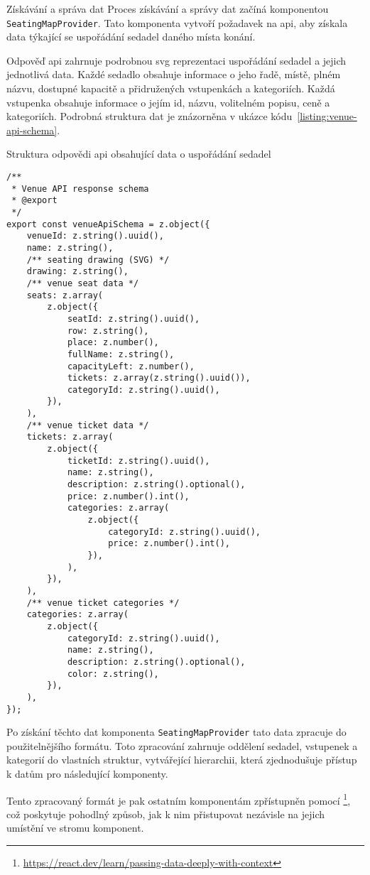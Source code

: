 \begin{subsection}{Získávání a správa dat}
    \label{subsec:implementace-seating-data}
    Proces získávání a správy dat začíná komponentou \texttt{SeatingMapProvider}.
    Tato komponenta vytvoří požadavek na \ac{api}, aby získala data týkající se uspořádání sedadel daného místa konání.

    Odpověď \ac{api} zahrnuje podrobnou \ac{svg} reprezentaci uspořádání sedadel a jejich jednotlivá data.
    Každé sedadlo obsahuje informace o jeho řadě, místě, plném názvu, dostupné kapacitě a přidružených vstupenkách a kategoriích.
    Každá vstupenka obsahuje informace o jejím id, názvu, volitelném popisu, ceně a kategoriích.
    Podrobná struktura dat je znázorněna v ukázce kódu~\ref{listing:venue-api-schema}.

    \begin{listing}[H]
        \caption{Struktura odpovědi \ac{api} obsahující data o uspořádání sedadel}
        \begin{verbatim}
/**
 * Venue API response schema
 * @export
 */
export const venueApiSchema = z.object({
	venueId: z.string().uuid(),
	name: z.string(),
	/** seating drawing (SVG) */
	drawing: z.string(),
	/** venue seat data */
	seats: z.array(
		z.object({
			seatId: z.string().uuid(),
			row: z.string(),
			place: z.number(),
			fullName: z.string(),
			capacityLeft: z.number(),
			tickets: z.array(z.string().uuid()),
			categoryId: z.string().uuid(),
		}),
	),
	/** venue ticket data */
	tickets: z.array(
		z.object({
			ticketId: z.string().uuid(),
			name: z.string(),
			description: z.string().optional(),
			price: z.number().int(),
			categories: z.array(
				z.object({
					categoryId: z.string().uuid(),
					price: z.number().int(),
				}),
			),
		}),
	),
	/** venue ticket categories */
	categories: z.array(
		z.object({
			categoryId: z.string().uuid(),
			name: z.string(),
			description: z.string().optional(),
			color: z.string(),
		}),
	),
});
        \end{verbatim}
        \label{listing:venue-api-schema}
    \end{listing}

    Po získání těchto dat komponenta \texttt{SeatingMapProvider} tato data zpracuje do použitelnějšího formátu.
    Toto zpracování zahrnuje oddělení sedadel, vstupenek a kategorií do vlastních struktur, vytvářející hierarchii, která zjednodušuje přístup k datům pro následující komponenty.

    Tento zpracovaný formát je pak ostatním komponentám zpřístupněn pomocí \footnote{\url{https://react.dev/learn/passing-data-deeply-with-context}}, což poskytuje pohodlný způsob, jak k nim přistupovat nezávisle na jejich umístění ve stromu komponent.
\end{subsection}


